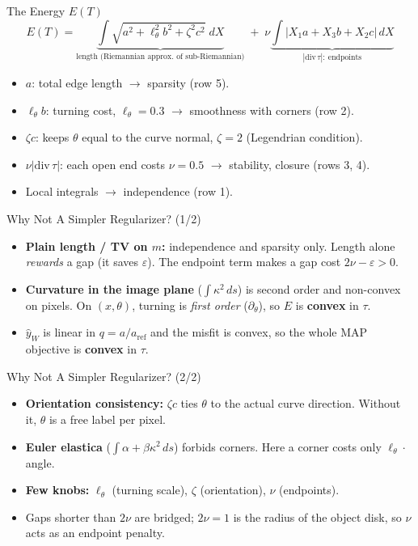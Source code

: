 \documentclass[aspectratio=169]{beamer}
\begin{document}
\begin{frame}{The Energy $E(T)$}
  \[
    E(T)=\underbrace{\int\!\sqrt{a^2+\ell_\theta^2 b^2+\zeta^2c^2}\;dX}_{\text{length (Riemannian approx.\ of sub-Riemannian)}}
    \;+\;\nu\underbrace{\int\!\bigl|X_1a+X_3b+X_2c\bigr|\,dX}_{|\mathrm{div}\,\tau|:\ \text{endpoints}}
  \]
  \begin{itemize}
    \item $a$: total edge length $\to$ sparsity (row 5).
    \item $\ell_\theta b$: turning cost, $\ell_\theta=0.3$ $\to$ smoothness with corners (row 2).
    \item $\zeta c$: keeps $\theta$ equal to the curve normal, $\zeta=2$ (Legendrian condition).
    \item $\nu|\mathrm{div}\,\tau|$: each open end costs $\nu=0.5$ $\to$ stability, closure (rows 3, 4).
    \item Local integrals $\to$ independence (row 1).
  \end{itemize}
\end{frame}

\begin{frame}{Why Not A Simpler Regularizer? (1/2)}
  \begin{itemize}
    \item \textbf{Plain length / TV on $m$:} independence and sparsity only. Length alone \emph{rewards} a gap (it saves $\varepsilon$). The endpoint term makes a gap cost $2\nu-\varepsilon>0$.
    \item \textbf{Curvature in the image plane} ($\int\kappa^2\,ds$) is second order and non-convex on pixels. On $(x,\theta)$, turning is \emph{first order} ($\partial_\theta$), so $E$ is \textbf{convex} in $\tau$.
    \item $\hat y_W$ is linear in $q=a/a_\mathrm{ref}$ and the misfit is convex, so the whole MAP objective is \textbf{convex} in $\tau$.
  \end{itemize}
\end{frame}

\begin{frame}{Why Not A Simpler Regularizer? (2/2)}
  \begin{itemize}
    \item \textbf{Orientation consistency:} $\zeta c$ ties $\theta$ to the actual curve direction. Without it, $\theta$ is a free label per pixel.
    \item \textbf{Euler elastica} ($\int\alpha+\beta\kappa^2\,ds$) forbids corners. Here a corner costs only $\ell_\theta\cdot$angle.
    \item \textbf{Few knobs:} $\ell_\theta$ (turning scale), $\zeta$ (orientation), $\nu$ (endpoints).
    \item Gaps shorter than $2\nu$ are bridged; $2\nu=1$ is the radius of the object disk, so $\nu$ acts as an endpoint penalty.
  \end{itemize}
\end{frame}
\end{document}
